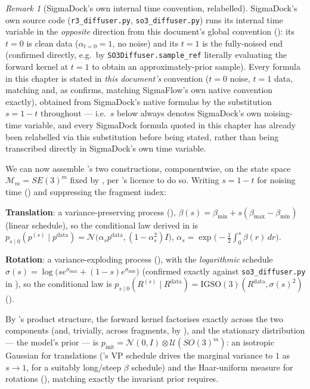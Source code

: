 \documentclass[11pt,a4paper]{report}
\theoremstyle{definition}
\theoremstyle{remark}
\newtheorem{remark}[remark]{Remark}
\newcommand{\file}[1]{\texttt{#1}}
\newcommand{\pyfunc}[1]{\texttt{#1}}
\begin{document}
\begin{remark}[SigmaDock's own internal time convention, relabelled]
\label{rem:time-convention-scratch}
SigmaDock's own source code (\file{r3\_diffuser.py}, \file{so3\_diffuser.py})
runs its internal time variable in the \emph{opposite} direction from this
document's global convention (): its
$t=0$ is clean data ($\alpha_{t=0}=1$, no noise) and its $t=1$ is the
fully-noised end (confirmed directly, e.g.\ by
\pyfunc{SO3Diffuser.sample\_ref} literally evaluating the forward kernel at
$t=1$ to obtain an approximately-prior sample). Every formula in this
chapter is stated in \emph{this document's} convention
($t=0$ noise, $t=1$ data, matching  and,
as  confirms, matching SigmaFlow's own
native convention exactly), obtained from SigmaDock's native formulas by
the substitution $s=1-t$ throughout --- i.e.\ $s$ below always denotes
SigmaDock's own noising-time variable, and every SigmaDock formula quoted
in this chapter has already been relabelled via this substitution before
being stated, rather than being transcribed directly in SigmaDock's own
time variable.
\end{remark}

We can now assemble 's two
constructions, componentwise, on the state space
$\mathcal M_m=SE(3)^m$ fixed by , per
's licence to do so. Writing $s=1-t$ for noising
time () and suppressing the fragment
index:

\textbf{Translation}: a variance-preserving process (),
$\beta(s)=\beta_{\min}+s(\beta_{\max}-\beta_{\min})$ (linear schedule), so
the conditional law derived in  is
$p_{s\mid0}(p^{(s)}\mid p^{\mathrm{data}}) = \mathcal N\bigl(\alpha_sp^{\mathrm{data}},(1-\alpha_s^2)I\bigr)$,
$\alpha_s=\exp\bigl(-\tfrac12\int_0^s\beta(r)\,dr\bigr)$.

\textbf{Rotation}: a variance-exploding process (), with
the \emph{logarithmic} schedule
$\sigma(s)=\log\bigl(se^{\sigma_{\max}}+(1-s)e^{\sigma_{\min}}\bigr)$
(confirmed exactly against \file{so3\_diffuser.py} in
), so the conditional law is
$p_{s\mid0}(R^{(s)}\mid R^{\mathrm{data}}) = \mathrm{IGSO}(3)(R^{\mathrm{data}},\sigma(s)^2)$
().

By 's product structure, the forward kernel
factorises exactly across the two components (and, trivially, across
fragments, by ), and the stationary
distribution --- the model's prior --- is
$p_{\mathrm{init}} = \mathcal N(0,I)\otimes\mathcal U(SO(3)^m)$: an isotropic
Gaussian for translations ('s VP schedule
drives the marginal variance to $1$ as $s\to1$, for a suitably long/steep
$\beta$ schedule) and the Haar-uniform measure for rotations
(), matching exactly the invariant prior
 requires.
\end{document}

